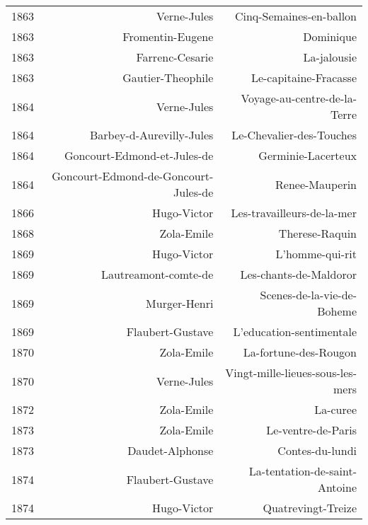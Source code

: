 \begin{xltabular}{\textwidth}{lrr}
1863 &                          Verne-Jules &               Cinq-Semaines-en-ballon \\
1863 &                     Fromentin-Eugene &                             Dominique \\
1863 &                      Farrenc-Cesarie &                           La-jalousie \\
1863 &                    Gautier-Theophile &                 Le-capitaine-Fracasse \\
1864 &                          Verne-Jules &          Voyage-au-centre-de-la-Terre \\
1864 &             Barbey-d-Aurevilly-Jules &              Le-Chevalier-des-Touches \\
1864 &          Goncourt-Edmond-et-Jules-de &                    Germinie-Lacerteux \\
1864 & Goncourt-Edmond-de-Goncourt-Jules-de &                        Renee-Mauperin \\
1866 &                          Hugo-Victor &            Les-travailleurs-de-la-mer \\
1868 &                           Zola-Emile &                        Therese-Raquin \\
1869 &                          Hugo-Victor &                       L'homme-qui-rit \\
1869 &                 Lautreamont-comte-de &                Les-chants-de-Maldoror \\
1869 &                         Murger-Henri &            Scenes-de-la-vie-de-Boheme \\
1869 &                     Flaubert-Gustave & L'education-sentimentale \\  
1870 &                           Zola-Emile &                 La-fortune-des-Rougon \\
1870 &                          Verne-Jules &      Vingt-mille-lieues-sous-les-mers \\
1872 &                           Zola-Emile &                              La-curee \\
1873 &                           Zola-Emile &                    Le-ventre-de-Paris \\
1873 &                      Daudet-Alphonse &                       Contes-du-lundi \\
1874 &                     Flaubert-Gustave &         La-tentation-de-saint-Antoine \\
1874 &                          Hugo-Victor &                    Quatrevingt-Treize \\

\end{xltabular}
